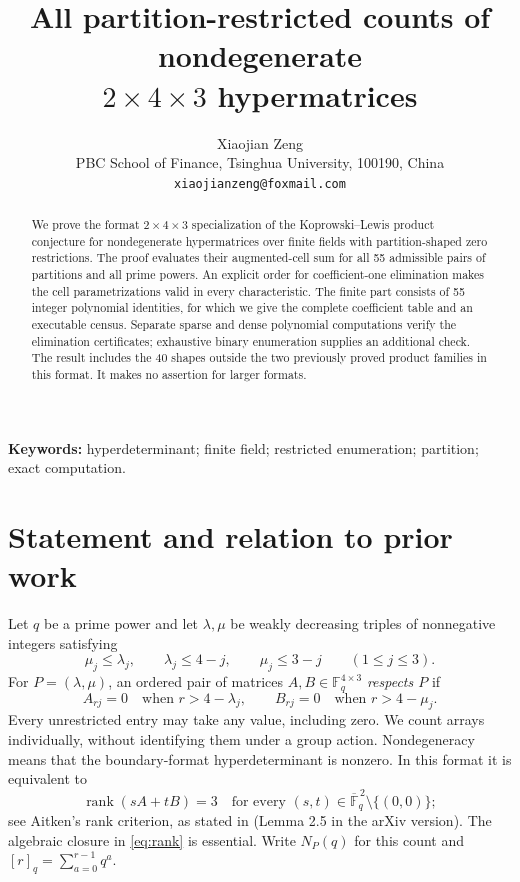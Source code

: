\documentclass[11pt]{article}
\title{All partition-restricted counts of nondegenerate\\$2\times4\times3$ hypermatrices}
\author{Xiaojian Zeng\\[3pt]
  \small PBC School of Finance, Tsinghua University, 100190, China\\
  \small\texttt{xiaojianzeng@foxmail.com}}
\date{}
\newcommand{\F}{\mathbb F}
\newcommand{\rank}{\operatorname{rank}}
\begin{document}
\maketitle
\begin{abstract}
We prove the format $2\times4\times3$ specialization of the
Koprowski--Lewis product conjecture for nondegenerate hypermatrices over
finite fields with partition-shaped zero restrictions. The proof evaluates
their augmented-cell sum for all 55 admissible pairs of partitions and
all prime powers. An explicit order for coefficient-one elimination makes
the cell parametrizations valid in every characteristic. The finite part
consists of 55 integer polynomial identities, for which we give the complete
coefficient table and an executable census. Separate sparse and dense
polynomial computations verify the elimination certificates; exhaustive
binary enumeration supplies an additional check. The result includes the
40 shapes outside the two previously proved product families in this
format. It makes no assertion for larger formats.
\end{abstract}
\noindent\textbf{Keywords:} hyperdeterminant; finite field; restricted enumeration;
partition; exact computation.

\section{Statement and relation to prior work}

Let $q$ be a prime power and let $\lambda,\mu$ be weakly decreasing triples
of nonnegative integers satisfying
\begin{equation}\label{eq:shapes}
 \mu_j\leq\lambda_j,\qquad \lambda_j\leq4-j,\qquad
 \mu_j\leq3-j\qquad(1\leq j\leq3).
\end{equation}
For $P=(\lambda,\mu)$, an ordered pair of matrices
$A,B\in\F_q^{4\times3}$ \emph{respects $P$} if
\begin{equation}\label{eq:zeros}
 A_{rj}=0\quad\text{when }r>4-\lambda_j,\qquad
 B_{rj}=0\quad\text{when }r>4-\mu_j.
\end{equation}
Every unrestricted entry may take any value, including zero. We count
arrays individually, without identifying them under a group action.
Nondegeneracy means that the boundary-format hyperdeterminant is nonzero.
In this format it is equivalent to
\begin{equation}\label{eq:rank}
 \rank(sA+tB)=3\quad\text{for every }(s,t)\in
 \overline{\F}_q^{\,2}\setminus\{(0,0)\};
\end{equation}
see Aitken's rank criterion, as stated in
\cite[Lemma 2.1]{KL} (Lemma 2.5 in the arXiv version).
The algebraic closure in \eqref{eq:rank} is essential.
Write $N_P(q)$ for this count and $[r]_q=\sum_{a=0}^{r-1}q^a$.
\end{document}

